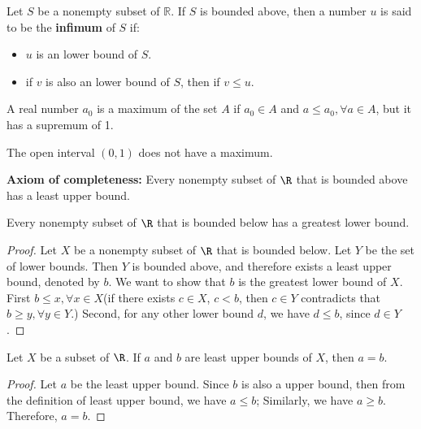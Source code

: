 \begin{refsection}
\begin{definition}\cite[5]{johnsonbaugh2010foundations}
	Let $S$ be a nonempty subset of $\mathbb{R}$. If $S$ is bounded above, then a number $u$ is said to be the \textbf{infimum} of $S$ if:
	\begin{itemize}
		\item $u$ is an lower bound of $S$.
		\item if $v$ is also an lower bound of $S$, then if $v \leq u$.
	\end{itemize}
\end{definition}

\begin{definition}
A real number $a_0$ is a maximum of the set $A$ if $a_0\in A$ and $a\leq a_0,\forall a\in A$, but it has a supremum of 1.
\end{definition}

\begin{remark}
The open interval $(0,1)$ does not have a maximum.
\end{remark}




\begin{theorem}\label{ch:sets:th:ExistenceOfLeastUpperBoundForBoundedRealSet}
	\textbf{Axiom of completeness:} Every nonempty subset of $\R$ that is bounded above has a least upper bound.
\end{theorem}

\begin{theorem}\cite[15]{johnsonbaugh2010foundations}
Every nonempty subset of $\R$ that is bounded below has a greatest lower bound.
\end{theorem}
\begin{proof}
Let $X$ be a nonempty subset of $\R$ that is bounded below. Let $Y$ be the set of lower bounds. Then $Y$ is bounded above, and therefore exists a least upper bound, denoted by $b$. We want to show that $b$ is the greatest lower bound of $X$. First $b\leq x,\forall x\in X$(if there exists $c\in X$, $c < b$, then $c\in Y$ contradicts that $b \geq y,\forall y\in Y$.) Second, for any other lower bound $d$, we have $d\leq b$, since $d\in Y$.
\end{proof}




\begin{lemma}\cite[15]{johnsonbaugh2010foundations}
Let $X$ be a subset of $\R$. If $a$ and $b$ are least upper bounds of $X$, then $a = b$.	
\end{lemma}
\begin{proof}
Let $a$ be the least upper bound. Since $b$ is also a upper bound, then from the definition of least upper bound, we have $a\leq b$; Similarly, we have $a\geq b$. 
Therefore, $a = b$.
\end{proof}


\end{refsection}

